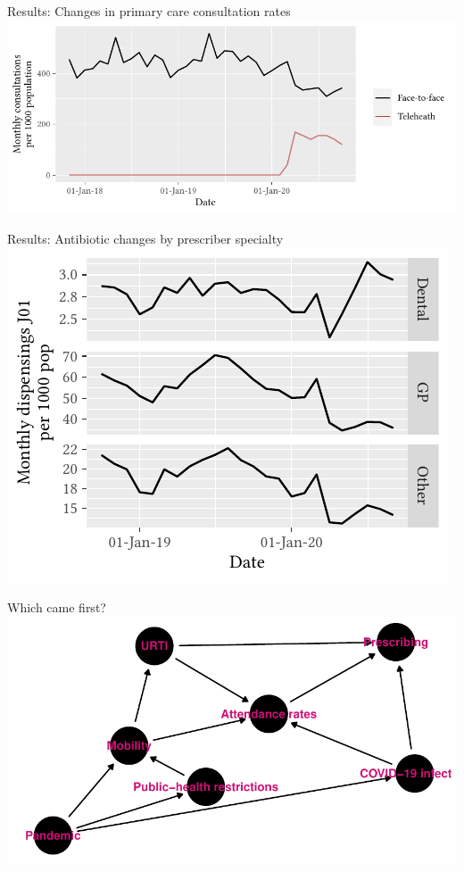 \documentclass[aspectratio=169,12pt]{beamer} %
\begin{document}
\begin{frame}{Results: Changes in primary care consultation rates}
\centering
\includegraphics{ref/latex-suppmbs-1.pdf}
\nocite{gillies_2022}
\end{frame}

\begin{frame}{Results: Antibiotic changes by prescriber specialty}
\centering
\includegraphics{ref/latex-j01specialty-1.pdf}
\end{frame}

\begin{frame}{Which came first?}
\centering
\includegraphics[height=0.8\textheight]
        {ref/dag.pdf}
\end{frame}
\end{document}
